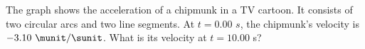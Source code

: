 The graph shows the acceleration of a chipmunk in a TV
cartoon. It consists of two circular arcs and two line
segments. At $t=0$.00 $s$, the chipmunk's velocity is 
$-3.10\ \munit/\sunit$. What is its velocity at $t=10.00$ s?
\answercheck
